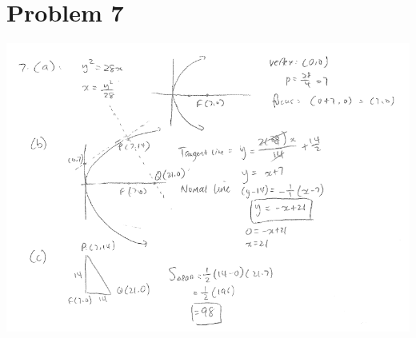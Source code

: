 \documentclass{article}
\begin{document}
\section*{Problem 7}
\centering
\vspace*{-10pt}
\includegraphics*[width=\linewidth]{q7.png}
\flushleft
\end{document}
